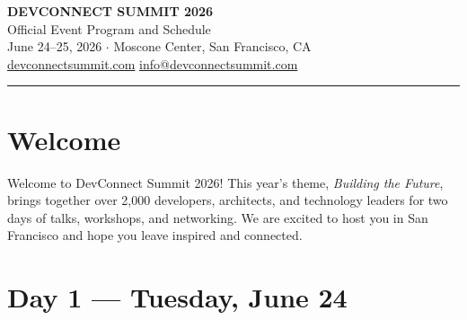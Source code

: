 \documentclass[
    language=english,
    doctype=program,
    institution=none,
]{../../omnilatex}
\begin{document}
\begin{center}
    {\Huge\bfseries DEVCONNECT SUMMIT 2026}\\[6pt]
    {\large Official Event Program and Schedule}\\[4pt]
    {\small June 24--25, 2026 $\cdot$ Moscone Center, San Francisco, CA}\\
    {\small \href{https://devconnectsummit.com}{devconnectsummit.com}
    \hfill \href{mailto:info@devconnectsummit.com}{info@devconnectsummit.com}}
\end{center}

\vspace{0.5em}
\noindent\rule{\textwidth}{0.4pt}
\vspace{0.5em}

\section*{Welcome}

Welcome to DevConnect Summit 2026! This year's theme, \emph{Building the
Future}, brings together over 2,000 developers, architects, and technology
leaders for two days of talks, workshops, and networking. We are excited to
host you in San Francisco and hope you leave inspired and connected.

\vspace{0.5em}

\section*{Day 1 --- Tuesday, June 24}
\end{document}
